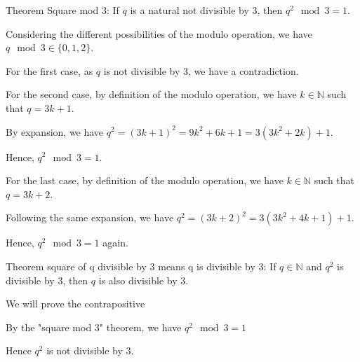 Theorem Square mod 3: If $q$ is a natural not divisible by $3$, then $q^2 \mod 3 = 1$.

Considering the different possibilities of the modulo operation, we have $q \mod 3 \in \{ 0, 1, 2 \}$.

For the first case, as $q$ is not divisible by $3$, we have a contradiction.

For the second case, by definition of the modulo operation, we have $k \in \mathbb{N}$ such that $q = 3k + 1$.

By expansion, we have $q^2 = (3k+1)^2 = 9k^2+6k+1 = 3(3k^2 + 2k) + 1$.

Hence, $q^2 \mod 3 = 1$.

For the last case, by definition of the modulo operation, we have $k \in \mathbb{N}$ such that $q = 3k + 2$.

Following the same expansion, we have $q^2 = (3k+2)^2 = 3(3k^2+4k+1) +1$.

Hence, $q^2 \mod 3 = 1$ again.

Theorem square of q divisible by 3 means q is divisible by 3: If $q \in \mathbb{N}$ and $q^2$ is divisible by $3$, then $q$ is also divisible by $3$.

We will prove the contrapositive

By the "square mod 3" theorem, we have $q^2 \mod 3 = 1$

Hence $q^2$ is not divisible by $3$.